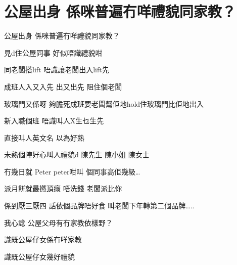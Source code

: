 \chapter{公屋出身 係咪普遍冇咩禮貌同家教？}

公屋出身 係咪普遍冇咩禮貌同家教？

見d住公屋同事 好似唔識禮貌咁

同老闆搭lift 唔識讓老闆出入lift先

成班人入又入先 出又出先 阻住個老闆

玻璃門又係呀 夠膽死成班要老闆幫佢地hold住玻璃門比佢地出入

新入職個班 唔識叫人X生乜生先

直接叫人英文名 以為好熟

未熟個陣好心叫人禮貌d 陳先生 陳小姐 陳女士

冇幾日就 Peter peter咁叫 個同事高佢幾級…

派月餅就最撚頂癮 唔洗錢 老闆派比你

係到厭三厭四 話依個品牌唔好食 叫老闆下年轉第二個品牌…..

我心諗 公屋父母有冇家教依樣野？

識既公屋仔女係冇咩家教

識既公屋仔女幾好禮貌

